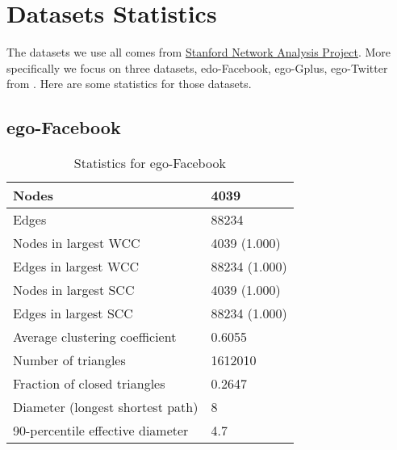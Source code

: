 \documentclass[12pt,a4paper]{article}
\begin{document}
\section*{Datasets Statistics}
\par The datasets we use all comes from \href{http://snap.stanford.edu/}{Stanford Network Analysis Project}\cite{SNAP}. More specifically we focus on three datasets, edo-Facebook, ego-Gplus, ego-Twitter from \cite{detect}. Here are some statistics for those datasets.
\subsection*{ego-Facebook}
\begin{table}[H]
\centering
\begin{tabular}{|l|l|}
\hline
Nodes                   & 4039\\ \hline
Edges                   & 88234\\ \hline
Nodes in largest WCC    & 4039 (1.000)\\ \hline
Edges in largest WCC    & 88234 (1.000)\\ \hline
Nodes in largest SCC    & 4039 (1.000)\\ \hline
Edges in largest SCC    & 88234 (1.000)\\ \hline
Average clustering coefficient      & 0.6055\\ \hline
Number of triangles                 & 1612010\\ \hline
Fraction of closed triangles        & 0.2647\\ \hline
Diameter (longest shortest path)    & 8\\ \hline
90-percentile effective diameter    & 4.7\\ \hline
\end{tabular}
\caption{Statistics for ego-Facebook}
\end{table}
\end{document}
